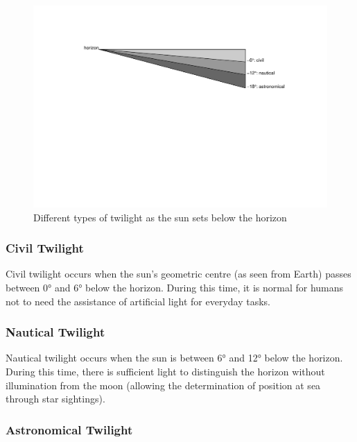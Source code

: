 \documentclass[
]{book}
\begin{document}
\begin{figure}

{\centering \includegraphics[width=0.9\linewidth]{_main_files/figure-latex/twilights-1} 

}

\caption{Different types of twilight as the sun sets below the horizon}\label{fig:twilights}
\end{figure}

\hypertarget{civil-twilight}{%
\subsubsection{Civil Twilight}\label{civil-twilight}}

Civil twilight occurs when the sun's geometric centre (as seen from Earth) passes between 0° and 6° below the horizon. During this time, it is normal for humans not to need the assistance of artificial light for everyday tasks.

\hypertarget{nautical-twilight}{%
\subsubsection{Nautical Twilight}\label{nautical-twilight}}

Nautical twilight occurs when the sun is between 6° and 12° below the horizon. During this time, there is sufficient light to distinguish the horizon without illumination from the moon (allowing the determination of position at sea through star sightings).

\hypertarget{astronomical-twilight}{%
\subsubsection{Astronomical Twilight}\label{astronomical-twilight}}
\end{document}
